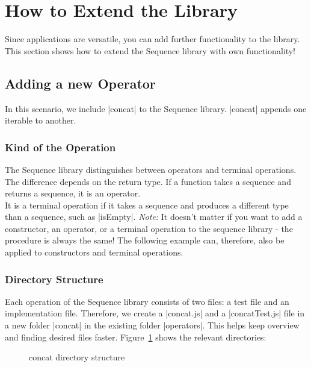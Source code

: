 \section{How to Extend the Library}
\label{sec:How to Extend the Library}
Since applications are versatile, you can add further functionality
to the library. This section shows how to extend the Sequence library with
own functionality!
\subsection{Adding a new Operator}
\label{sub:Adding a new Operator}
In this scenario, we include |concat| to the Sequence library. |concat| appends
one iterable to another.

\subsubsection{Kind of the Operation}
\label{subsub:Kind of the Operation}
The Sequence library distinguishes between operators and terminal operations. The
difference depends on the return type. If a function takes a sequence and
returns a sequence, it is an operator. \\ 
It is a terminal operation if it takes a sequence and produces a different type
than a sequence, such as |isEmpty|.
\newline
\textit{Note:} It doesn't matter if you want to add a constructor, an operator, or a terminal
operation to the sequence library - the procedure is always the same! The
following example can, therefore, also be applied to constructors and terminal
operations.

\subsubsection{Directory Structure}
\label{subsub:Directory Structure}
Each operation of the Sequence library consists of two files: a test file and
an implementation file. Therefore, we create a |concat.js| and a
|concatTest.js| file in a new folder |concat| in the existing folder
|operators|. This helps keep overview and finding desired files faster.
Figure~\ref{fig:concat_dir} shows the relevant directories:

\begin{figure}[H]
  \caption{concat directory structure}
  \label{fig:concat_dir}
\end{figure}

